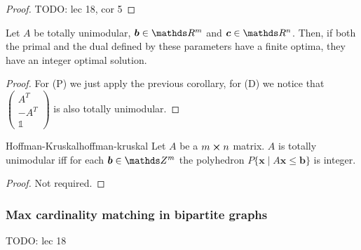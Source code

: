 \documentclass[12pt]{extarticle}
\renewcommand{\vec}[1]{\bm{#1}}
\begin{document}
\begin{proof}
	TODO: lec 18, cor 5
\end{proof}

\begin{corollary}{}{}
	Let $A$ be totally unimodular, $\vec b \in \R^m$ and $\vec c \in \R^n$. Then, if both the primal
	and the dual defined by these parameters have a finite optima, they have an integer optimal
	solution.
\end{corollary}

\begin{proof}
	For (P) we just apply the previous corollary, for (D) we notice that
	$\begin{pmatrix} A^T \\ -A^T \\ \mathds 1 \end{pmatrix}$ is also totally unimodular.
\end{proof}

\begin{theorem}{Hoffman-Kruskal}{hoffman-kruskal}
	Let $A$ be a $m \cross n$ matrix. $A$ is totally unimodular iff for each $\vec b \in \Z^m$ the
	polyhedron $P \{ \vec x \mid A \vec x \leq \vec b \}$ is integer.
\end{theorem}

\begin{proof} Not required. \end{proof}

\subsubsection{Max cardinality matching in bipartite graphs}

TODO: lec 18
\end{document}
